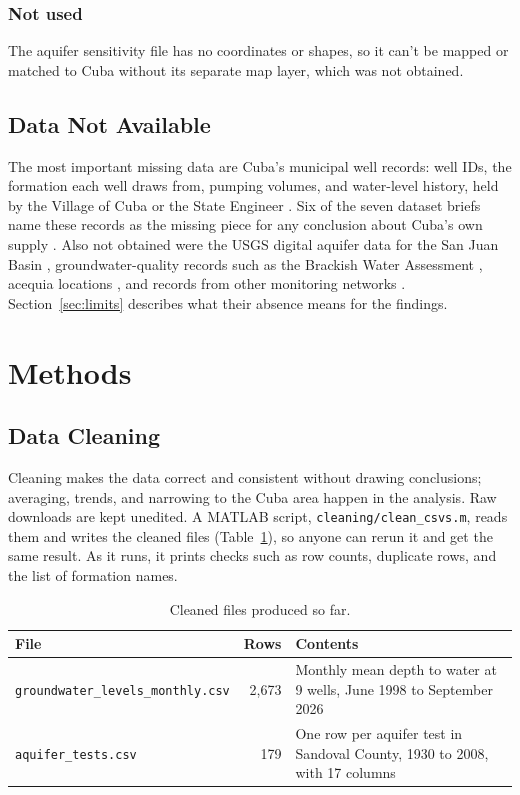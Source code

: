 \documentclass[10pt,twocolumn,letterpaper]{article}
\begin{document}
\subsubsection{Not used}
The aquifer sensitivity file \citep{nmwd_sensitivity} has no coordinates or shapes, so it can't be
mapped or matched to Cuba without its separate map layer, which was not obtained.

\subsection{Data Not Available}
The most important missing data are Cuba's municipal well records: well IDs, the formation each
well draws from, pumping volumes, and water-level history, held by the Village of Cuba or the
State Engineer \citep{nmose}. Six of the seven dataset briefs name these records as the missing
piece for any conclusion about Cuba's own supply
\citep{gonzales_brief1,gonzales_brief2,gonzales_brief4,gonzales_brief5,gonzales_brief6,gonzales_brief7}. Also not obtained were the USGS digital aquifer data for the San Juan Basin
\citep{usgs_rasa_sjb}, groundwater-quality records such as the Brackish Water Assessment
\citep{nmbg_bwa}, acequia locations \citep{isc_acequias}, and records from other monitoring
networks \citep{ngwmn,cgmn}. Section~\ref{sec:limits} describes what their absence means for the
findings.

\section{Methods}\label{sec:methods}
\subsection{Data Cleaning}
Cleaning makes the data correct and consistent without drawing conclusions; averaging, trends,
and narrowing to the Cuba area happen in the analysis. Raw downloads are kept unedited. A MATLAB
script, \texttt{cleaning/clean\_csvs.m}, reads them and writes the cleaned files
(Table~\ref{tab:cleaned}), so anyone can rerun it and get the same result. As it runs, it prints
checks such as row counts, duplicate rows, and the list of formation names.

\begin{table}[t]
  \caption{Cleaned files produced so far.}
  \label{tab:cleaned}
  \footnotesize
  \begin{tabularx}{\linewidth}{@{}>{\raggedright}p{1.15in}r>{\raggedright\arraybackslash}X@{}}
    \toprule
    \textbf{File} & \textbf{Rows} & \textbf{Contents} \\
    \midrule
    \nolinkurl{groundwater_levels_monthly.csv} & 2,673 & Monthly mean depth to water at
      9 wells, June 1998 to September 2026 \\
    \nolinkurl{aquifer_tests.csv} & 179 & One row per aquifer test in Sandoval County, 1930 to
      2008, with 17 columns \\
    \bottomrule
  \end{tabularx}
\end{table}
\end{document}
